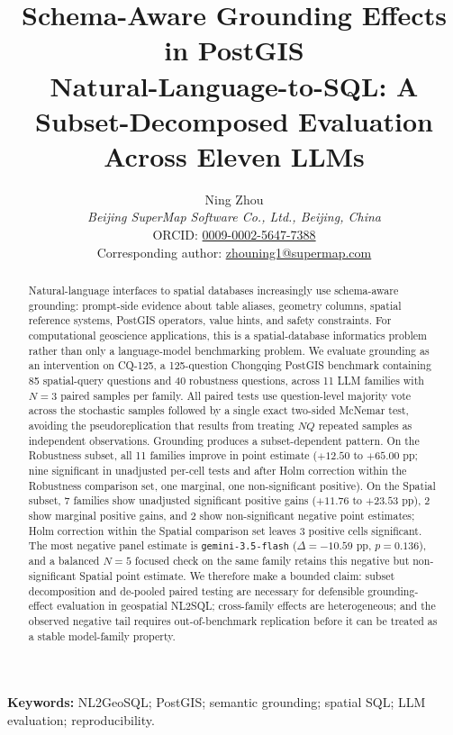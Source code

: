 \documentclass[11pt]{article}
\title{Schema-Aware Grounding Effects in PostGIS\\
       Natural-Language-to-SQL: A Subset-Decomposed Evaluation Across Eleven LLMs}
\author{Ning Zhou\\
\textit{Beijing SuperMap Software Co., Ltd., Beijing, China}\\
ORCID: \href{https://orcid.org/0009-0002-5647-7388}{0009-0002-5647-7388}\\
Corresponding author: \href{mailto:zhouning1@supermap.com}{zhouning1@supermap.com}}
\date{}
\begin{document}
\maketitle
\doublespacing
\linenumbers

\begin{abstract}
Natural-language interfaces to spatial databases increasingly use schema-aware
grounding: prompt-side evidence about table aliases, geometry columns, spatial
reference systems, PostGIS operators, value hints, and safety constraints. For
computational geoscience applications, this is a spatial-database informatics
problem rather than only a language-model benchmarking problem. We evaluate
grounding as an intervention on CQ-125, a 125-question Chongqing PostGIS
benchmark containing 85 spatial-query questions and 40 robustness questions,
across 11 LLM families with $N{=}3$ paired samples per family. All paired tests
use question-level majority vote across the stochastic samples followed by a
single exact two-sided McNemar test, avoiding the pseudoreplication that results
from treating $NQ$ repeated samples as independent observations. Grounding
produces a subset-dependent pattern. On the Robustness subset, all 11
families improve in point estimate ($+12.50$ to $+65.00$ pp; nine significant in
unadjusted per-cell tests and after Holm correction within the Robustness
comparison set, one marginal, one non-significant positive). On the Spatial
subset, 7 families show unadjusted significant positive gains ($+11.76$ to
$+23.53$ pp), 2 show marginal positive gains, and 2 show non-significant negative
point estimates; Holm correction within the Spatial comparison set leaves 3
positive cells significant. The most negative panel estimate is \texttt{gemini-3.5-flash}
($\Delta=-10.59$ pp, $p=0.136$), and a balanced $N{=}5$ focused check on the
same family retains this negative but non-significant Spatial point estimate.
We therefore make a bounded claim: subset
decomposition and de-pooled paired testing are necessary for defensible
grounding-effect evaluation in geospatial NL2SQL; cross-family effects are
heterogeneous; and the observed negative tail requires out-of-benchmark
replication before it can be treated as a stable model-family property.
\end{abstract}

\noindent\textbf{Keywords:} NL2GeoSQL; PostGIS; semantic grounding; spatial SQL; LLM evaluation; reproducibility.
\end{document}

